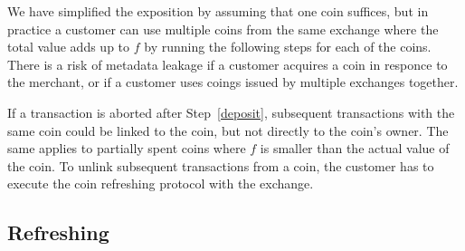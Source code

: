 \documentclass{llncs}
\begin{document}
We have simplified the exposition by assuming that one coin suffices, but
in practice a customer can use multiple coins from the same exchange where
the total value adds up to $f$ by running the following steps for
each of the coins.  There is a risk of metadata leakage if a customer
acquires a coin in responce to the merchant, or if a customer uses
coings issued by multiple exchanges together.

If a transaction is aborted after Step~\ref{deposit},
subsequent transactions with the same coin could be linked to the coin,
but not directly to the coin's owner.  The same applies to partially
spent coins where $f$ is smaller than the actual value of the coin.
To unlink subsequent transactions from a coin, the customer has to
execute the coin refreshing protocol with the exchange.

%
%
%


\subsection{Refreshing} \label{sec:refreshing}
\end{document}
